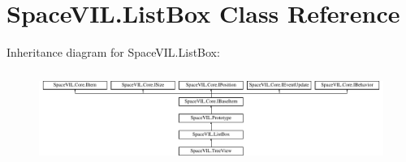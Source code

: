 \hypertarget{class_space_v_i_l_1_1_list_box}{}\section{Space\+V\+I\+L.\+List\+Box Class Reference}
\label{class_space_v_i_l_1_1_list_box}
Inheritance diagram for Space\+V\+I\+L.\+List\+Box\+:\begin{figure}[H]
\begin{center}
\leavevmode
\includegraphics[height=3.027027cm]{class_space_v_i_l_1_1_list_box}
\end{center}
\end{figure}
